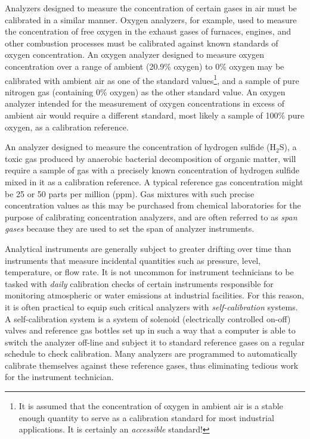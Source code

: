 \vskip 10pt

Analyzers designed to measure the concentration of certain gases in air must be calibrated in a similar manner.  Oxygen analyzers, for example, used to measure the concentration of free oxygen in the exhaust gases of furnaces, engines, and other combustion processes must be calibrated against known standards of oxygen concentration.  An oxygen analyzer designed to measure oxygen concentration over a range of ambient (20.9\% oxygen) to 0\% oxygen may be calibrated with ambient air as one of the standard values\footnote{It is assumed that the concentration of oxygen in ambient air is a stable enough quantity to serve as a calibration standard for most industrial applications.  It is certainly an \textit{accessible} standard!}, and a sample of pure nitrogen gas (containing 0\% oxygen) as the other standard value.  An oxygen analyzer intended for the measurement of oxygen concentrations in excess of ambient air would require a different standard, most likely a sample of 100\% pure oxygen, as a calibration reference.

\vskip 10pt

An analyzer designed to measure the concentration of hydrogen sulfide (H$_{2}$S), a toxic gas produced by anaerobic bacterial decomposition of organic matter, will require a sample of gas with a precisely known concentration of hydrogen sulfide mixed in it as a calibration reference.  A typical reference gas concentration might be 25 or 50 parts per million (ppm).  Gas mixtures with such precise concentration values as this may be purchased from chemical laboratories for the purpose of calibrating concentration analyzers, and are often referred to as \textit{span gases} because they are used to set the span of analyzer instruments.       

\vskip 10pt

Analytical instruments are generally subject to greater drifting over time than instruments that measure incidental quantities such as pressure, level, temperature, or flow rate.  It is not uncommon for instrument technicians to be tasked with \textit{daily} calibration checks of certain instruments responsible for monitoring atmospheric or water emissions at industrial facilities.  For this reason, it is often practical to equip such critical analyzers with \textit{self-calibration} systems.  A self-calibration system is a system of solenoid (electrically controlled on-off) valves and reference gas bottles set up in such a way that a computer is able to switch the analyzer off-line and subject it to standard reference gases on a regular schedule to check calibration.  Many analyzers are programmed to automatically calibrate themselves against these reference gases, thus eliminating tedious work for the instrument technician.  

